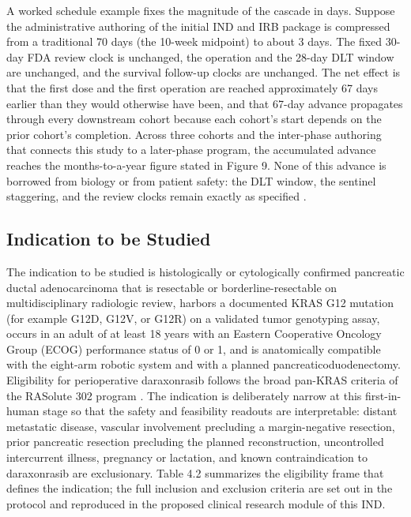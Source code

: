 A worked schedule example fixes the magnitude of the cascade in days. Suppose the
administrative authoring of the initial IND and IRB package is compressed from a
traditional 70 days (the 10-week midpoint) to about 3 days. The fixed 30-day FDA
review clock is unchanged, the operation and the 28-day DLT window are unchanged,
and the survival follow-up clocks are unchanged. The net effect is that the first
dose and the first operation are reached approximately 67 days earlier than they
would otherwise have been, and that 67-day advance propagates through every
downstream cohort because each cohort's start depends on the prior cohort's
completion. Across three cohorts and the inter-phase authoring that connects this
study to a later-phase program, the accumulated advance reaches the months-to-a-year
figure stated in Figure 9. None of this advance is borrowed from biology or from
patient safety: the DLT window, the sentinel staggering, and the review clocks
remain exactly as specified \cite{paipredict4x,clintrustpai}.

\subsection{Indication to be Studied}

The indication to be studied is histologically or cytologically confirmed pancreatic
ductal adenocarcinoma that is resectable or borderline-resectable on
multidisciplinary radiologic review, harbors a documented KRAS G12 mutation (for
example G12D, G12V, or G12R) on a validated tumor genotyping assay, occurs in an
adult of at least 18 years with an Eastern Cooperative Oncology Group (ECOG)
performance status of 0 or 1, and is anatomically compatible with the eight-arm
robotic system and with a planned pancreaticoduodenectomy. Eligibility for
perioperative daraxonrasib follows the broad pan-KRAS criteria of the RASolute 302
program \cite{daraxwhipple}. The indication is deliberately narrow at this
first-in-human stage so that the safety and feasibility readouts are interpretable:
distant metastatic disease, vascular involvement precluding a margin-negative
resection, prior pancreatic resection precluding the planned reconstruction,
uncontrolled intercurrent illness, pregnancy or lactation, and known
contraindication to daraxonrasib are exclusionary. Table 4.2 summarizes the
eligibility frame that defines the indication; the full inclusion and exclusion
criteria are set out in the protocol and reproduced in the proposed clinical
research module of this IND.

